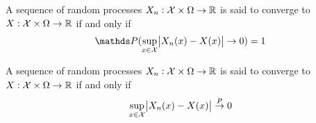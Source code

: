 
\begin{defn} 
  A sequence of random processes $X_n : \mathcal{X} \times \Omega \to \mathbb{R}$
  is said to converge  to $X: \mathcal{X} \times \Omega \to \mathbb{R}$ if and only if
  \[ \Prob(\sup_{x \in \Cal{X}} \abs{X_n(x) - X(x)} \to 0) = 1 \]
\end{defn}

\begin{defn} 
  A sequence of random processes $X_n: \mathcal{X} \times \Omega \to \mathbb{R}$
  is said to converge  to $X : \mathcal{X} \times \Omega \to \mathbb{R}$ if and only if
  \[ \sup_{x \in \mathcal{X}} \abs{X_n(x) - X(x)} \overset{P}{\to} 0 \]
\end{defn}
